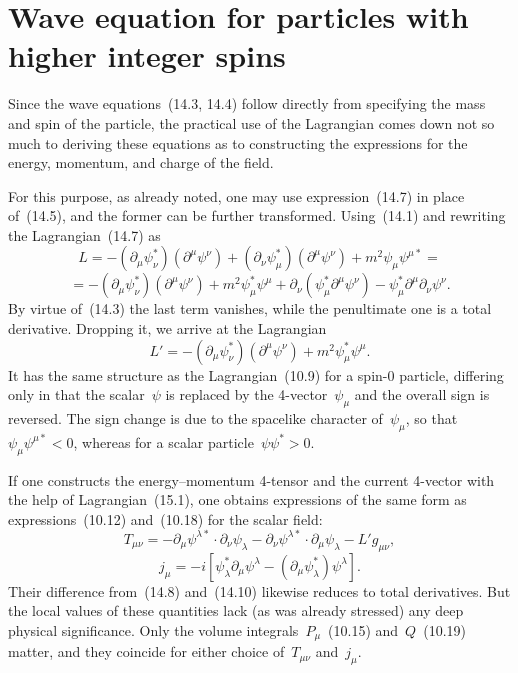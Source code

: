 \section{Wave equation for particles with higher integer spins}

Since the wave equations~(14.3, 14.4) follow directly from specifying the mass and spin of the particle, the practical use of the Lagrangian comes down not so much to deriving these equations as to constructing the expressions for the energy, momentum, and charge of the field.

For this purpose, as already noted, one may use expression~(14.7) in place of~(14.5), and the former can be further transformed. Using~(14.1) and rewriting the Lagrangian~(14.7) as
\begin{equation}
L = -\left(\partial_\mu\psi^*_\nu\right)\left(\partial^\mu\psi^\nu\right) + \left(\partial_\nu\psi^*_\mu\right)\left(\partial^\mu\psi^\nu\right) + m^2\psi_\mu\psi^{\mu*} =
\tag{15.1}
\end{equation}
\[
= -\left(\partial_\mu\psi^*_\nu\right)\left(\partial^\mu\psi^\nu\right) + m^2\psi^*_\mu\psi^\mu + \partial_\nu\left(\psi^*_\mu\partial^\mu\psi^\nu\right) - \psi^*_\mu\partial^\mu\partial_\nu\psi^\nu.
\]
By virtue of~(14.3) the last term vanishes, while the penultimate one is a total derivative. Dropping it, we arrive at the Lagrangian
\[
L' = -\left(\partial_\mu\psi^*_\nu\right)\left(\partial^\mu\psi^\nu\right) + m^2\psi^*_\mu\psi^\mu.
\]
It has the same structure as the Lagrangian~(10.9) for a spin-0 particle, differing only in that the scalar~$\psi$ is replaced by the 4-vector~$\psi_\mu$ and the overall sign is reversed. The sign change is due to the spacelike character of~$\psi_\mu$, so that~$\psi_\mu\psi^{\mu*} < 0$, whereas for a scalar particle~$\psi\psi^* > 0$.

If one constructs the energy--momentum 4-tensor and the current 4-vector with the help of Lagrangian~(15.1), one obtains expressions of the same form as expressions~(10.12) and~(10.18) for the scalar field:
\begin{equation}
T_{\mu\nu} = -\partial_\mu\psi^{\lambda*} \cdot \partial_\nu\psi_\lambda - \partial_\nu\psi^{\lambda*} \cdot \partial_\mu\psi_\lambda - L'g_{\mu\nu},
\tag{15.2}
\end{equation}
\begin{equation}
j_\mu = -i\left[\psi^*_\lambda\partial_\mu\psi^\lambda - \left(\partial_\mu\psi^*_\lambda\right)\psi^\lambda\right].
\tag{15.3}
\end{equation}
Their difference from~(14.8) and~(14.10) likewise reduces to total derivatives. But the local values of these quantities lack (as was
already stressed) any deep physical significance. Only the volume integrals~$P_\mu$~(10.15) and~$Q$~(10.19) matter, and they coincide for either choice of~$T_{\mu\nu}$ and~$j_\mu$.


